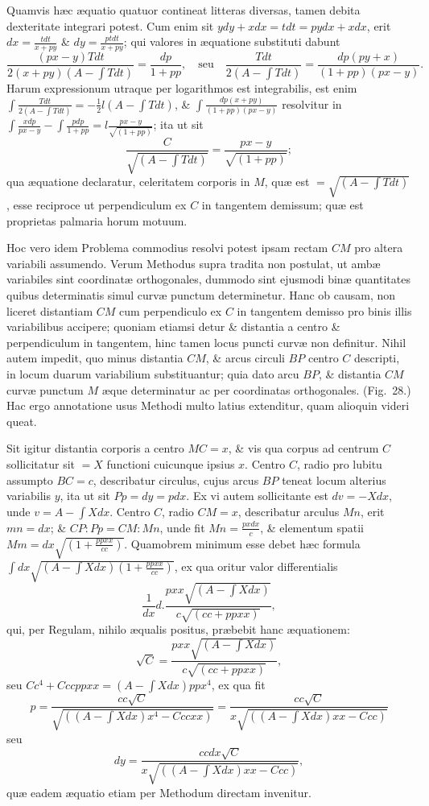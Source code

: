 Quamvis hæc æquatio quatuor contineat litteras diversas, tamen debita dexteritate integrari potest. Cum enim sit $ydy+xdx=tdt=pydx+xdx$, erit $dx=\frac{tdt}{x+py}$ \& $dy=\frac{ptdt}{x+py}$; qui valores in æquatione substituti dabunt
\[\frac{(px-y)Tdt}{2(x+py)(A-\int Tdt)}=\frac{dp}{1+pp},\quad\text{seu}\quad\frac{Tdt}{2(A-\int Tdt)}=\frac{dp(py+x)}{(1+pp)(px-y)}.\]
Harum expressionum utraque per logarithmos est integrabilis, est enim $\int\frac{Tdt}{2(A-\int Tdt)}=-\frac12l(A-\int Tdt)$, \& $\int\frac{dp(x+py)}{(1+pp)(px-y)}$ resolvitur in $\int\frac{xdp}{px-y}-\int\frac{pdp}{1+pp}=l\frac{px-y}{\sqrt{(1+pp)}}$; ita ut sit
\[\frac C{\sqrt{(A-\int Tdt)}}=\frac{px-y}{\sqrt{(1+pp)}};\]
qua æquatione declaratur, celeritatem corporis in $M$, quæ est $=\sqrt{(A-\int Tdt)}$, esse reciproce ut perpendiculum ex $C$ in tangentem demissum; quæ est proprietas palmaria horum motuum.

Hoc vero idem Problema commodius resolvi potest ipsam rectam $CM$ pro altera variabili assumendo. Verum Methodus supra tradita non postulat, ut ambæ variabiles sint coordinatæ orthogonales, dummodo sint ejusmodi binæ quantitates quibus determinatis simul curvæ punctum determinetur. Hanc ob causam, non liceret distantiam $CM$ cum perpendiculo ex $C$ in tangentem demisso pro binis illis variabilibus accipere; quoniam etiamsi detur \& distantia a centro \& perpendiculum in tangentem, hinc tamen locus puncti curvæ non definitur. Nihil autem impedit, quo minus distantia $CM$, \& arcus circuli $BP$ centro $C$ descripti, in locum duarum variabilium substituantur; quia dato arcu $BP$, \& distantia $CM$ curvæ punctum $M$ æque determinatur ac per coordinatas orthogonales. (Fig.~28.) Hac ergo annotatione usus Methodi multo latius extenditur, quam alioquin videri queat.

Sit igitur distantia corporis a centro $MC=x$, \& vis qua corpus ad centrum $C$ sollicitatur sit $=X$ functioni cuicunque ipsius $x$. Centro $C$, radio pro lubitu assumpto $BC=c$, describatur circulus, cujus arcus $BP$ teneat locum alterius variabilis $y$, ita ut sit $Pp=dy=pdx$. Ex vi autem sollicitante est $dv=-Xdx$, unde $v=A-\int Xdx$. Centro $C$, radio $CM=x$, describatur arculus $Mn$, erit $mn=dx$; \& $CP:Pp=CM:Mn$, unde fit $Mn=\frac{pxdx}{c}$, \& elementum spatii $Mm=dx\sqrt{(1+\frac{ppxx}{cc})}$. Quamobrem minimum esse debet hæc formula $\int dx\sqrt{(A-\int Xdx)(1+\frac{ppxx}{cc})}$, ex qua oritur valor differentialis
\[\frac1{dx}d.\frac{pxx\sqrt{(A-\int Xdx)}}{c\sqrt{(cc+ppxx)}},\]
qui, per Regulam, nihilo æqualis positus, præbebit hanc æquationem:
\[\sqrt C=\frac{pxx\sqrt{(A-\int Xdx)}}{c\sqrt{(cc+ppxx)}},\]
seu $Cc^4+Cccppxx=(A-\int Xdx)ppx^4$, ex qua fit
\[p=\frac{cc\sqrt C}{\sqrt{((A-\int Xdx)x^4-Cccxx)}}=\frac{cc\sqrt C}{x\sqrt{((A-\int Xdx)xx-Ccc)}}\]
seu
\[dy=\frac{ccdx\sqrt C}{x\sqrt{((A-\int Xdx)xx-Ccc)}},\]
quæ eadem æquatio etiam per Methodum directam invenitur.

